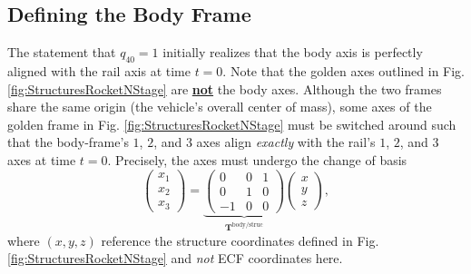 \documentclass[11pt,dvipsnames]{thesis}
\begin{document}
\subsection{Defining the Body Frame}
The statement that $q_{40} = 1$ initially realizes that the body axis is perfectly aligned with the rail axis at time $t = 0$. Note that the golden axes outlined in Fig. \ref{fig:StructuresRocketNStage} are \underline{\textbf{not}} the body axes. Although the two frames share the same origin (the vehicle's overall center of mass), some axes of the golden frame in Fig. \ref{fig:StructuresRocketNStage} must be switched around such that the body-frame's $1$, $2$, and $3$ axes align \textit{exactly} with the rail's $1$, $2$, and $3$ axes at time $t = 0$. Precisely, the axes must undergo the change of basis
\begin{equation}
\begin{pmatrix}x_{1} \\ x_{2} \\ x_{3}\end{pmatrix} = \underbrace{\begin{pmatrix}0 & 0 & 1 \\ 0 & 1 & 0 \\ -1 & 0 & 0\end{pmatrix}}_{\mathbf{T}^{\text{body}/\text{struc}}} \begin{pmatrix} x \\ y \\ z\end{pmatrix},
\end{equation}
where $(x, y, z)$ reference the structure coordinates defined in Fig. \ref{fig:StructuresRocketNStage} and \textit{not} ECF coordinates here.
\end{document}
